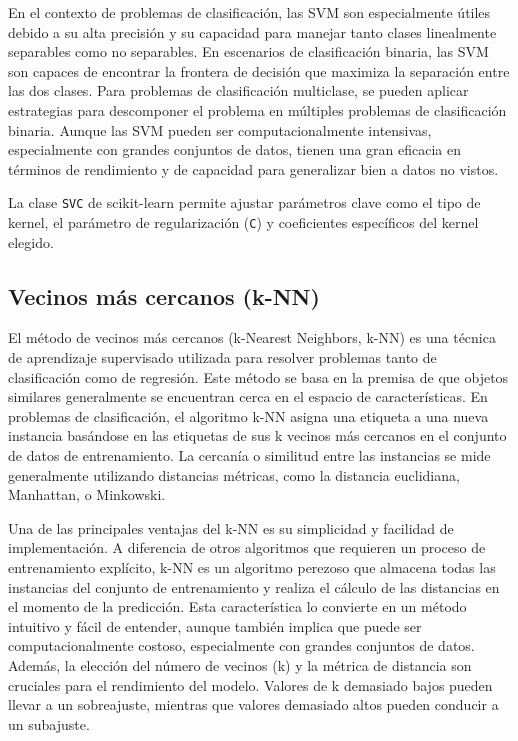 En el contexto de problemas de clasificación, las SVM son especialmente útiles debido a su alta precisión y su capacidad para manejar tanto clases linealmente separables como no separables. En escenarios de clasificación binaria, las SVM son capaces de encontrar la frontera de decisión que maximiza la separación entre las dos clases. Para problemas de clasificación multiclase, se pueden aplicar estrategias para descomponer el problema en múltiples problemas de clasificación binaria. Aunque las SVM pueden ser computacionalmente intensivas, especialmente con grandes conjuntos de datos, tienen una gran eficacia en términos de rendimiento y de capacidad para generalizar bien a datos no vistos.

La clase \texttt{SVC} \cite{sk-svm} de scikit-learn permite ajustar parámetros clave como el tipo de kernel, el parámetro de regularización (\texttt{C}) y coeficientes específicos del kernel elegido.

\subsection{Vecinos más cercanos (k-NN)}
\label{subsec:model-neighbors}

El método de vecinos más cercanos (k-Nearest Neighbors, k-NN) es una técnica de aprendizaje supervisado utilizada para resolver problemas tanto de clasificación como de regresión. Este método se basa en la premisa de que objetos similares generalmente se encuentran cerca en el espacio de características. En problemas de clasificación, el algoritmo k-NN asigna una etiqueta a una nueva instancia basándose en las etiquetas de sus k vecinos más cercanos en el conjunto de datos de entrenamiento. La cercanía o similitud entre las instancias se mide generalmente utilizando distancias métricas, como la distancia euclidiana, Manhattan, o Minkowski.

Una de las principales ventajas del k-NN es su simplicidad y facilidad de implementación. A diferencia de otros algoritmos que requieren un proceso de entrenamiento explícito, k-NN es un algoritmo perezoso que almacena todas las instancias del conjunto de entrenamiento y realiza el cálculo de las distancias en el momento de la predicción. Esta característica lo convierte en un método intuitivo y fácil de entender, aunque también implica que puede ser computacionalmente costoso, especialmente con grandes conjuntos de datos. Además, la elección del número de vecinos (k) y la métrica de distancia son cruciales para el rendimiento del modelo. Valores de k demasiado bajos pueden llevar a un sobreajuste, mientras que valores demasiado altos pueden conducir a un subajuste.

